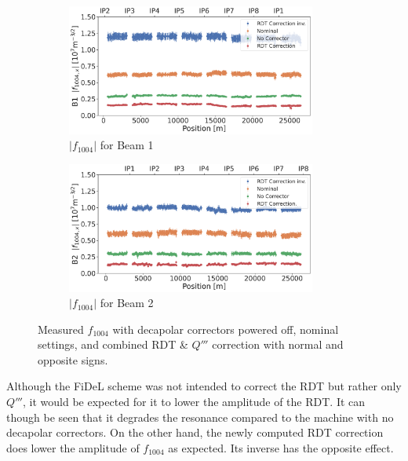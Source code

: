 \begin{figure}[!htb]
    \centering
    \begin{subfigure}{1\textwidth}
        \includegraphics[width=0.9\textwidth]{./images/f1004/f1004x_corrections_B1.pdf}
        \caption{$|f_{1004}|$ for Beam 1}
        \vspace{0.5cm}
    \end{subfigure}
    \begin{subfigure}{1\textwidth}
        \includegraphics[width=0.9\textwidth]{./images/f1004/f1004x_corrections_B2.pdf}
        \caption{$|f_{1004}|$ for Beam 2}
    \end{subfigure}
    \caption{Measured $f_{1004}$ with decapolar correctors powered off, nominal settings, and
    combined RDT \& $Q'''$ correction with normal and opposite signs.}
    \label{fig:decapoles:rdts:f1004_correction_B2}
\end{figure}


Although the FiDeL scheme was not intended to correct the RDT but rather only $Q'''$, it would be 
expected for it to lower the amplitude of the RDT. It can though be seen that it degrades the
resonance compared to the machine with no decapolar correctors. On the other hand, the newly
computed RDT correction does lower the amplitude of $f_{1004}$ as expected.  Its inverse has the
opposite effect.

